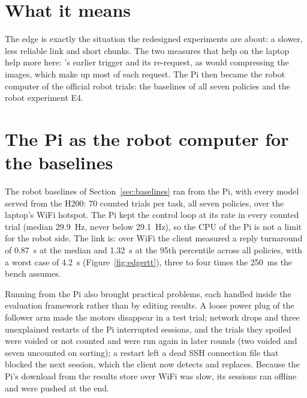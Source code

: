 \section{What it means}

The edge is exactly the situation the redesigned experiments are about: a slower, less reliable link and short chunks.
The two measures that help on the laptop help more here: \drtc's earlier trigger and its re-request, as would compressing
the images, which make up most of each request. The Pi then became the robot computer of the official robot trials: the baselines of all seven policies and the
robot experiment E4.

\section{The Pi as the robot computer for the baselines}
The robot baselines of Section~\ref{sec:baselines} ran from the Pi, with every model served from the H200: 70 counted
trials per task, all seven policies, over the laptop's WiFi hotspot. The Pi kept the control loop at its rate in every
counted trial (median 29.9~Hz, never below 29.1~Hz), so the CPU of the Pi is not a limit for the robot side. The link
is: over WiFi the client measured a reply turnaround of 0.87~s at the median and 1.32~s at the 95th percentile across
all policies, with a worst case of 4.2~s (Figure~\ref{fig:edgertt}), three to four times the 250~ms the bench assumes.

Running from the Pi also brought practical problems, each handled inside the evaluation framework rather than by
editing results. A loose power plug of the follower arm made the motors disappear in a test trial; network drops and
three unexplained restarts of the Pi interrupted sessions, and the trials they spoiled were voided or not counted and
were run again in later rounds (two voided and seven uncounted on sorting); a restart left a dead SSH connection file
that blocked the next session, which the client now detects and replaces. Because the Pi's download from the results
store over WiFi was slow, its sessions ran offline and were pushed at the end.

